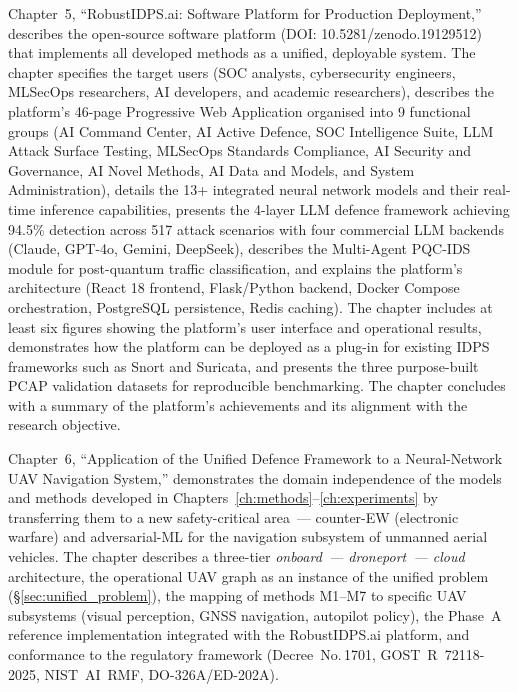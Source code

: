 Chapter~5, ``RobustIDPS.ai: Software Platform for Production Deployment,'' describes the open-source software platform (DOI: 10.5281/zenodo.19129512) that implements all developed methods as a unified, deployable system. The chapter specifies the target users (SOC analysts, cybersecurity engineers, MLSecOps researchers, AI developers, and academic researchers), describes the platform's 46-page Progressive Web Application organised into 9 functional groups (AI Command Center, AI Active Defence, SOC Intelligence Suite, LLM Attack Surface Testing, MLSecOps Standards Compliance, AI Security and Governance, AI Novel Methods, AI Data and Models, and System Administration), details the 13+ integrated neural network models and their real-time inference capabilities, presents the 4-layer LLM defence framework achieving 94.5\% detection across 517 attack scenarios with four commercial LLM backends (Claude, GPT-4o, Gemini, DeepSeek), describes the Multi-Agent PQC-IDS module for post-quantum traffic classification, and explains the platform's architecture (React 18 frontend, Flask/Python backend, Docker Compose orchestration, PostgreSQL persistence, Redis caching). The chapter includes at least six figures showing the platform's user interface and operational results, demonstrates how the platform can be deployed as a plug-in for existing IDPS frameworks such as Snort and Suricata, and presents the three purpose-built PCAP validation datasets for reproducible benchmarking. The chapter concludes with a summary of the platform's achievements and its alignment with the research objective.

Chapter~6, ``Application of the Unified Defence Framework to a
Neural-Network UAV Navigation System,'' demonstrates the domain
independence of the models and methods developed in
Chapters~\ref{ch:methods}--\ref{ch:experiments} by transferring them
to a new safety-critical area~--- counter-EW (electronic warfare) and
adversarial-ML for the navigation subsystem of unmanned aerial
vehicles. The chapter describes a three-tier
\emph{onboard~--- droneport~--- cloud} architecture, the operational
UAV graph as an instance of the unified problem (\S\ref{sec:unified_problem}),
the mapping of methods \textsf{M1}--\textsf{M7} to specific UAV
subsystems (visual perception, GNSS navigation, autopilot policy),
the Phase~A reference implementation integrated with the
\textsf{RobustIDPS.ai} platform, and conformance to the regulatory
framework (Decree~No.\,1701, \mbox{GOST~R~72118-2025},
\mbox{NIST~AI~RMF}, \mbox{DO-326A/ED-202A}).

